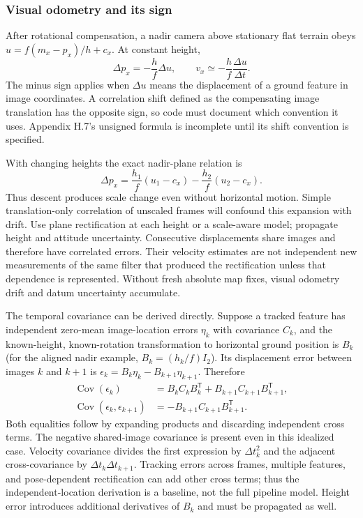 \documentclass[11pt,a4paper]{article}
\numberwithin{equation}{section}
\begin{document}
\subsubsection{Visual odometry and its sign}

After rotational compensation, a nadir camera above stationary flat
terrain obeys $u=f(m_x-p_x)/h+c_x$. At constant height,
\begin{equation}
 \Delta p_x=-\frac h f\Delta u,\qquad
 v_x\simeq-\frac h f\frac{\Delta u}{\Delta t}.
 \label{eq:vo-sign}
\end{equation}
The minus sign applies when $\Delta u$ means the displacement of a
ground feature in image coordinates. A correlation shift defined as
the compensating image translation has the opposite sign, so code
must document which convention it uses. Appendix H.7's unsigned
formula is incomplete until its shift convention is specified.

With changing heights the exact nadir-plane relation is
\begin{equation}
 \Delta p_x=\frac{h_1}{f}(u_1-c_x)-\frac{h_2}{f}(u_2-c_x).
\end{equation}
Thus descent produces scale change even without horizontal motion.
Simple translation-only correlation of unscaled frames will confound
this expansion with drift. Use plane rectification at each height or
a scale-aware model; propagate height and attitude uncertainty.
Consecutive displacements share images and therefore have correlated
errors. Their velocity estimates are not independent new measurements
of the same filter that produced the rectification unless that
dependence is represented. Without fresh absolute map fixes, visual
odometry drift and datum uncertainty accumulate.

The temporal covariance can be derived directly. Suppose a tracked
feature has independent zero-mean image-location errors $\eta_k$ with
covariance $C_k$, and the known-height, known-rotation transformation to
horizontal ground position is $B_k$ (for the aligned nadir example,
$B_k=(h_k/f)I_2$). Its displacement error between images $k$ and $k+1$
is $\epsilon_k=B_k\eta_k-B_{k+1}\eta_{k+1}$. Therefore
\begin{align}
 \operatorname{Cov}(\epsilon_k)
 &=B_kC_kB_k^{\mathsf T}+B_{k+1}C_{k+1}B_{k+1}^{\mathsf T},\\
 \operatorname{Cov}(\epsilon_k,\epsilon_{k+1})
 &=-B_{k+1}C_{k+1}B_{k+1}^{\mathsf T}.
 \label{eq:vo-temporal-covariance}
\end{align}
Both equalities follow by expanding products and discarding independent
cross terms. The negative shared-image covariance is present even in
this idealized case. Velocity covariance divides the first expression
by $\Delta t_k^2$ and the adjacent cross-covariance by
$\Delta t_k\Delta t_{k+1}$. Tracking errors across frames, multiple
features, and pose-dependent rectification can add other cross terms;
thus the independent-location derivation is a baseline, not the full
pipeline model. Height error introduces additional derivatives of
$B_k$ and must be propagated as well.
\end{document}
